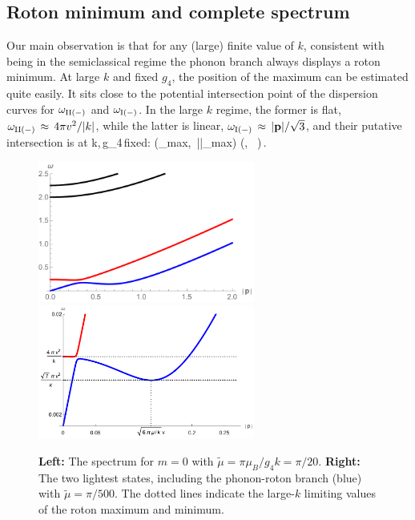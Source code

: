 \subsection{Roton minimum and complete spectrum}
Our main observation is that for any (large) finite value of $k$, consistent with being in the semiclassical regime the phonon branch always displays a roton minimum. 
At large $k$ and fixed $g_4$, the position of the maximum can be estimated quite easily. It sits close to the potential intersection point of the dispersion curves for $\omega_{\rm II(-)}$ and $\omega_{\rm I (-)}$. In the large $k$ regime, the former is flat, $\omega_{\rm II(-)}\,\approx\, 4\pi v^2/|k|$, while the latter is linear, $\omega_{\rm I(-)} \,\approx\, |{\bf p}|/\sqrt{3}$, and their putative intersection is at 
\be
k,\,g_4\,{\rm fixed}: \qquad \left(\rm \omega_{\rm max},\, |\p|_{\rm max}\right)\,\approx\,\left(, \, \right)\,.
\ee
\begin{figure}[h]
\begin{center}
\includegraphics[width=2.8in]{Chapter_3_Folder_1806.06976/figures/spectrumk20.pdf}\hspace{0.1in}\includegraphics[width=2.8in]{Chapter_3_Folder_1806.06976/figures/rotonk500.pdf}
\end{center}
    \caption[This figure shows the position and heigh of the roton maximum, in addition to the mass of the lowest state for large values of $k$.]{ \small{{\bf Left:} The spectrum for $m=0$ with $\tilde\mu =\pi \mu_{B}/g_4 k =\pi/20 $. {\bf Right:} The two lightest states, including the phonon-roton branch (blue) with $\tilde\mu=\pi/500$. The dotted lines indicate the large-$k$ limiting values of the roton maximum and minimum.
}}
\label{largek}
\end{figure}
